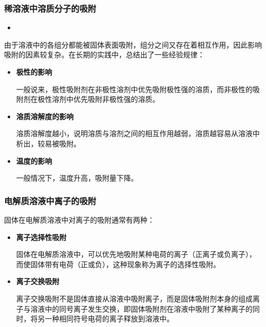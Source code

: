 \begin{frame}
    \frametitle{稀溶液中溶质分子的吸附}
    \begin{itemize}
        \item[2.] 
    \end{itemize}
    由于溶液中的各组分都能被固体表面吸附，组分之间又存在着相互作用，因此影响吸附的因素较复杂。在长期的实践中，总结出了一些经验规律：
    \begin{itemize}
        \item \bf{极性的影响}
        
        一般说来，极性吸附剂在非极性溶剂中优先吸附极性强的溶质，而非极性的吸附剂在极性溶剂中优先吸附非极性强的溶质。
        \item \bf{溶质溶解度的影响}
        
        溶质溶解度越小，说明溶质与溶剂之间的相互作用越弱，溶质越容易从溶液中析出，较易被吸附。
        \item \bf{温度的影响}
        
        一般情况下，温度升高，吸附量下降。
    \end{itemize}

\end{frame}


\begin{frame}
    \frametitle{电解质溶液中离子的吸附}

    固体在电解质溶液中对离子的吸附通常有两种：
    \begin{itemize}
        \item \bf{离子选择性吸附}
        
        固体在电解质溶液中，可以优先地吸附某种电荷的离子（正离子或负离子），而使固体带有电荷（正或负），这种现象称为离子的选择性吸附。
        \item \bf{离子交换吸附}
        
        离子交换吸附不是固体直接从溶液中吸附离子，而是固体吸附剂本身的组成离子与溶液中的同号离子发生交换，即固体吸附剂在溶液中吸附了某种离子的同时，将另一种相同符号电荷的离子释放到溶液中。
    \end{itemize}

\end{frame}